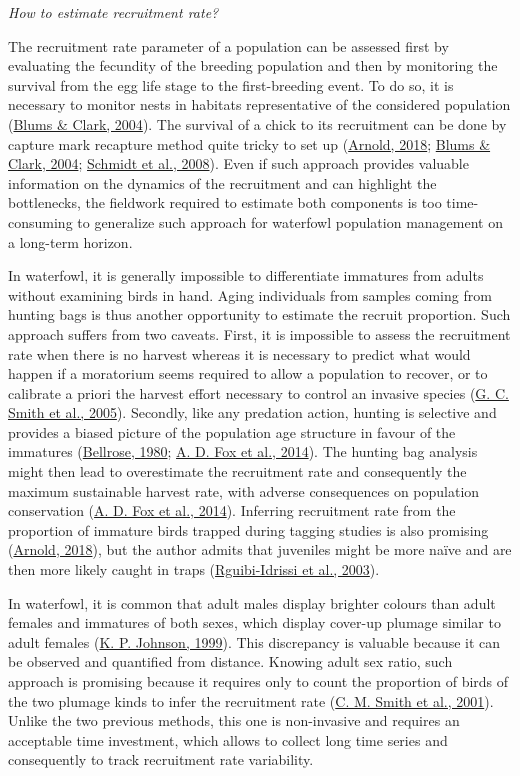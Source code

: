 \documentclass[
  english,
]{article}
\begin{document}
\emph{How to estimate recruitment rate?}

The recruitment rate parameter of a population can be assessed first by evaluating the fecundity of the breeding population and then by monitoring the survival from the egg life stage to the first-breeding event. To do so, it is necessary to monitor nests in habitats representative of the considered population (\protect\hyperlink{ref-Blums2004}{Blums \& Clark, 2004}). The survival of a chick to its recruitment can be done by capture mark recapture method quite tricky to set up (\protect\hyperlink{ref-Arnold2018}{Arnold, 2018}; \protect\hyperlink{ref-Blums2004}{Blums \& Clark, 2004}; \protect\hyperlink{ref-Schmidt2008}{Schmidt et al., 2008}). Even if such approach provides valuable information on the dynamics of the recruitment and can highlight the bottlenecks, the fieldwork required to estimate both components is too time-consuming to generalize such approach for waterfowl population management on a long-term horizon.

In waterfowl, it is generally impossible to differentiate immatures from adults without examining birds in hand. Aging individuals from samples coming from hunting bags is thus another opportunity to estimate the recruit proportion. Such approach suffers from two caveats. First, it is impossible to assess the recruitment rate when there is no harvest whereas it is necessary to predict what would happen if a moratorium seems required to allow a population to recover, or to calibrate a priori the harvest effort necessary to control an invasive species (\protect\hyperlink{ref-Smith2005}{G. C. Smith et al., 2005}). Secondly, like any predation action, hunting is selective and provides a biased picture of the population age structure in favour of the immatures (\protect\hyperlink{ref-Bellrose1980}{Bellrose, 1980}; \protect\hyperlink{ref-Fox2014}{A. D. Fox et al., 2014}). The hunting bag analysis might then lead to overestimate the recruitment rate and consequently the maximum sustainable harvest rate, with adverse consequences on population conservation (\protect\hyperlink{ref-Fox2014}{A. D. Fox et al., 2014}). Inferring recruitment rate from the proportion of immature birds trapped during tagging studies is also promising (\protect\hyperlink{ref-Arnold2018}{Arnold, 2018}), but the author admits that juveniles might be more naïve and are then more likely caught in traps (\protect\hyperlink{ref-RguibiIdrissi2003}{Rguibi-Idrissi et al., 2003}).

In waterfowl, it is common that adult males display brighter colours than adult females and immatures of both sexes, which display cover-up plumage similar to adult females (\protect\hyperlink{ref-Johnson1999}{K. P. Johnson, 1999}). This discrepancy is valuable because it can be observed and quantified from distance. Knowing adult sex ratio, such approach is promising because it requires only to count the proportion of birds of the two plumage kinds to infer the recruitment rate (\protect\hyperlink{ref-Smith2001}{C. M. Smith et al., 2001}). Unlike the two previous methods, this one is non-invasive and requires an acceptable time investment, which allows to collect long time series and consequently to track recruitment rate variability.
\end{document}
